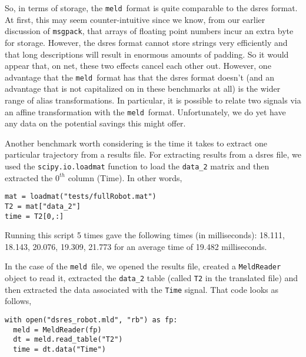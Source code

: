 \documentclass[11pt,a4paper,twocolumn]{article}
\newcommand{\meld}{\texttt{meld}}
\newcommand{\msgpack}{\texttt{msgpack}}
\newcommand{\code}[1]{\texttt{#1}} %
\begin{document}
So, in terms of storage, the \meld\ format is quite comparable to the
dsres format.  At first, this may seem counter-intuitive since we
know, from our earlier discussion of \msgpack, that arrays of floating
point numbers incur an extra byte for storage.  However, the dsres
format cannot store strings very efficiently and that long
descriptions will result in enormous amounts of padding.  So it would
appear that, on net, these two effects cancel each other out.
However, one advantage that the \meld\ format has that the dsres
format doesn't (and an advantage that is not capitalized on in these
benchmarks at all) is the wider range of alias transformations.  In
particular, it is possible to relate two signals via an affine
transformation with the \meld\ format.  Unfortunately, we do yet have
any data on the potential savings this might offer.


Another benchmark worth considering is the time it takes to extract
one particular trajectory from a results file.  For extracting results
from a dsres file, we used the \code{scipy.io.loadmat} function to
load the \code{data\_2} matrix and then extracted the $0^{th}$ column
(Time).  In other words,

\begin{verbatim}
mat = loadmat("tests/fullRobot.mat")
T2 = mat["data_2"]
time = T2[0,:]
\end{verbatim}

Running this script 5 times gave the following times (in
milliseconds): 18.111, 18.143, 20.076, 19.309, 21.773 for an average time
of 19.482 milliseconds.

In the case of the \meld\ file, we opened the results file, created a
\code{MeldReader} object to read it, extracted the \code{data\_2}
table (called \code{T2} in the translated file) and then extracted the
data associated with the \code{Time} signal.  That code looks as
follows,

\begin{verbatim}
with open("dsres_robot.mld", "rb") as fp:
  meld = MeldReader(fp)
  dt = meld.read_table("T2")
  time = dt.data("Time")
\end{verbatim}
\end{document}
